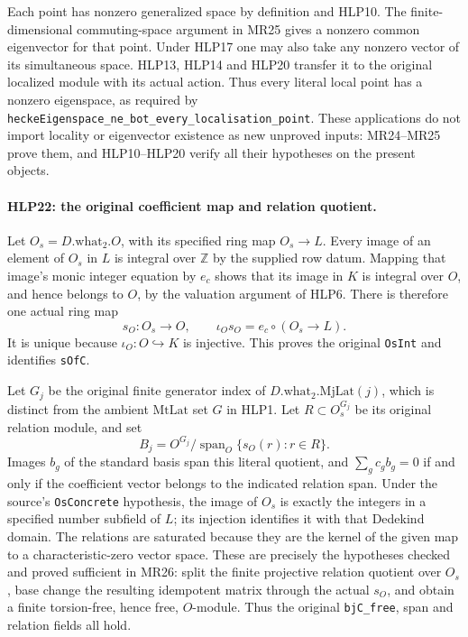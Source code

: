 Each point has nonzero generalized space by definition and HLP10.
The finite-dimensional commuting-space argument in MR25 gives
a nonzero common eigenvector for that point. Under HLP17 one may
also take any nonzero vector of its simultaneous space.
HLP13, HLP14 and HLP20 transfer it to the original localized
module with its actual action. Thus every literal local point has
a nonzero eigenspace, as required by
\texttt{heckeEigenspace\_ne\_bot\_every\_localisation\_point}.
These applications do not import locality or eigenvector
existence as new unproved inputs: MR24--MR25 prove them, and
HLP10--HLP20 verify all their hypotheses on the present objects.

\paragraph{HLP22: the original coefficient map and relation quotient.}
\label{claim:HLP22}
Let \(O_s=D.\mathrm{what}_2.O\), with its specified ring map
\(O_s\to L\). Every image of an element of \(O_s\) in \(L\) is
integral over \(\mathbb Z\) by the supplied row datum. Mapping
that image's monic integer equation by \(e_c\) shows that its image in \(K\) is
integral over \(O\), and hence belongs to \(O\), by the valuation
argument of HLP6. There is therefore one actual ring map
\[
 s_O:O_s\longrightarrow O,\qquad
  \iota_Os_O=e_c\circ(O_s\to L).                    \tag{HLP.20}
\]
It is unique because \(\iota_O:O\hookrightarrow K\) is injective.
This proves the original \texttt{OsInt} and identifies
\texttt{sOfC}.

Let \(G_j\) be the original finite generator index of
\(D.\mathrm{what}_2.\mathrm{MjLat}(j)\), which is distinct from the
ambient \(\mathrm{MtLat}\) set \(G\) in HLP1. Let
\(R\subset O_s^{G_j}\) be its original relation module, and set
\[
 B_j=O^{G_j}/\operatorname{span}_O\{s_O(r):r\in R\}.    \tag{HLP.21}
\]
Images \(b_g\) of the standard basis span this literal quotient,
and \(\sum_g c_gb_g=0\) if and only if the coefficient vector
belongs to the indicated relation span. Under the source's
\texttt{OsConcrete} hypothesis, the image of \(O_s\) is exactly
the integers in a specified number subfield of \(L\); its
injection identifies it with that Dedekind domain. The relations
are saturated because they are the kernel of the given map to a
characteristic-zero vector space. These are precisely the
hypotheses checked and proved sufficient in MR26: split the
finite projective relation quotient over \(O_s\), base change
the resulting idempotent matrix through the actual \(s_O\), and
obtain a finite torsion-free, hence free, \(O\)-module. Thus the
original \texttt{bjC\_free}, span and relation fields all hold.


